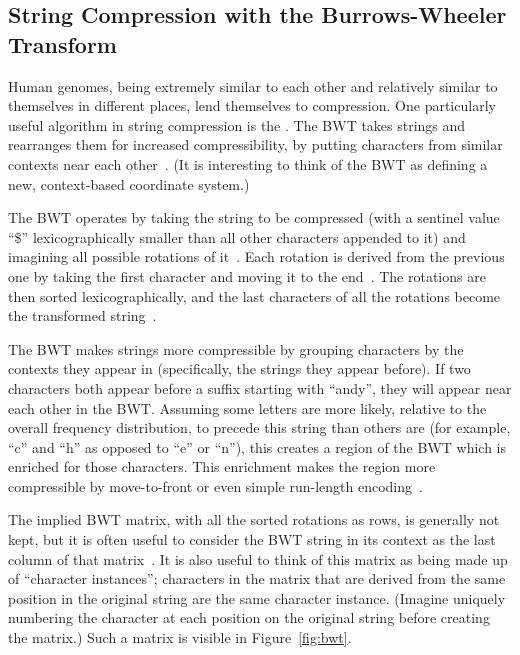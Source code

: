 \subsection{String Compression with the Burrows-Wheeler Transform}
\label{subsec:bwt}

Human genomes, being extremely similar to each other and relatively similar to themselves in different places, lend themselves to compression. One particularly useful algorithm in string compression is the . The BWT takes strings and rearranges them for increased compressibility, by putting characters from similar contexts near each other~\cite{burrows1994block}. (It is interesting to think of the BWT as defining a new, context-based coordinate system.)

The BWT operates by taking the string to be compressed (with a sentinel value ``\$'' lexicographically smaller than all other characters appended to it) and imagining all possible rotations of it~\cite{burrows1994block, ferragina2000opportunistic}. Each rotation is derived from the previous one by taking the first character and moving it to the end~\cite{burrows1994block}. The rotations are then sorted lexicographically, and the last characters of all the rotations become the transformed string~\cite{burrows1994block}.

The BWT makes strings more compressible by grouping characters by the contexts they appear in (specifically, the strings they appear before). If two characters both appear before a suffix starting with ``andy'', they will appear near each other in the BWT. Assuming some letters are more likely, relative to the overall frequency distribution, to precede this string than others are (for example, ``c'' and ``h'' as opposed to ``e'' or ``n''), this creates a region of the BWT which is enriched for those characters. This enrichment makes the region more compressible by move-to-front or even simple run-length encoding~\cite{burrows1994block}.

The implied BWT matrix, with all the sorted rotations as rows, is generally not kept, but it is often useful to consider the BWT string in its context as the last column of that matrix~\cite{burrows1994block, ferragina2000opportunistic}. It is also useful to think of this matrix as being made up of ``character instances''; characters in the matrix that are derived from the same position in the original string are the same character instance. (Imagine uniquely numbering the character at each position on the original string before creating the matrix.) Such a matrix is visible in Figure~\ref{fig:bwt}.

